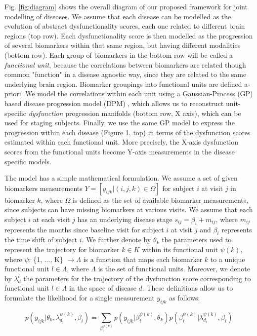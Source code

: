 \documentclass{llncs}
\begin{document}
Fig. \ref{fig:diagram} shows the overall diagram of our proposed framework for joint modelling of diseases. We assume that each disease can be modelled as the evolution of abstract dysfunctionality scores, each one related to different brain regions (top row). Each dysfunctionality score is then modelled as the progression of several biomarkers within that same region, but having different modalities (bottom row). Each group of biomarkers in the bottom row will be called a \emph{functional unit}, because the correlations between biomarkers are related though common "function" in a disease agnostic way, since they are related to the same underlying brain region. Biomarker groupings into functional units are defined a-priori. We model the correlations within each unit using a Gaussian-Process (GP) based disease progression model (DPM) \cite{lorenzi2017disease}, which allows us to reconstruct unit-specific \emph{dysfunction} progression manifolds (bottom row, X axis), which can be used for staging subjects. Finally, we use the same GP model to express the progression within each disease (Figure 1, top) in terms of the dysfunction scores estimated within each functional unit. More precisely, the X-axis dysfunction scores from the functional units become Y-axis measurements in the disease specific models.

The model has a simple mathematical formulation. We assume a set of given biomarkers measurements $Y = [y_{ijk} | (i,j,k) \in \Omega]$ for subject $i$ at visit $j$ in biomarker $k$, where $\Omega$ is defined as the set of available biomarker measurements, since subjects can have missing biomarkers at various visits. We assume that each subject $i$ at each visit $j$ has an underlying disease stage $s_{ij} = \beta_i + m_{ij}$, where $m_{ij}$ represents the months since baseline visit for subject $i$ at visit $j$ and $\beta_i$ represents the time shift of subject $i$. We further denote by $\theta_k$ the parameters used to represent the trajectory for biomarker $k \in K$ within its functional unit $\psi(k)$, where $\psi$: \{1, ..., K\} $ \rightarrow \Lambda$ is a function that maps each biomarker $k$ to a unique functional unit $l \in \Lambda$, where $\Lambda$ is the set of functional units. Moreover, we denote by $\lambda_d^l$ the parameters for the trajectory of the dysfunction score corresponding to functional unit $l \in \Lambda$ in the space of disease $d$. These definitions allow us to formulate the likelihood for a single measurement $y_{ijk}$ as follows:

\begin{equation}
 p(y_{ijk}|\theta_k, \lambda_{d_i}^{\psi(k)}, \beta_i) = \sum_{\beta_i^{\psi(k)}} p(y_{ijk}| \beta_i^{\psi(k)}, \theta_k) p(\beta_i^{\psi(k)}| \lambda_{d_i}^{\psi(k)}, \beta_i)
\end{equation}
\end{document}
